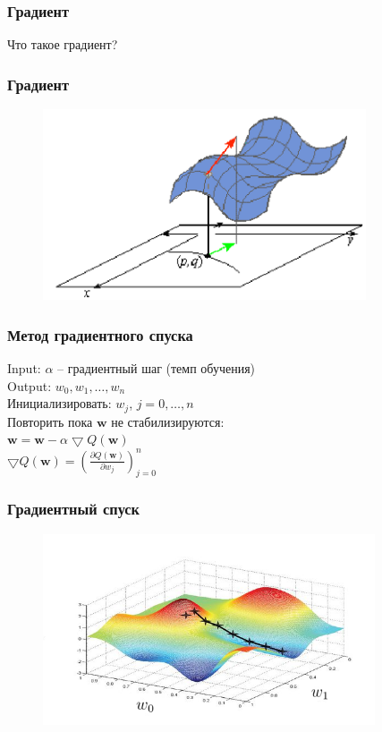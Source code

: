 \documentclass[12pt]{beamer}
\begin{document}
\begin{frame}\frametitle{Градиент}
Что такое градиент?
\end{frame}

\begin{frame}\frametitle{Градиент}
\begin{figure}[htbp]
  \includegraphics[height=160pt, keepaspectratio = true]{images/gradient}
\end{figure}
\end{frame}

\begin{frame}\frametitle{Метод градиентного спуска}
Input: $\alpha$ -- градиентный шаг (темп обучения)\\
Output: $w_0, w_1, \dots, w_n$\\
\vspace{3mm}
Инициализировать: $w_j$, $j=0,\dots, n$\\
Повторить пока $\mathbf{w}$ не стабилизируются:\\
\hspace{10mm} $\mathbf{w} =  \mathbf{w} - \alpha \bigtriangledown Q(\mathbf{w})$\\

\vspace{10mm}
$\bigtriangledown Q(\mathbf{w}) = (\frac{\partial Q(\mathbf{w})}{\partial w_j})_{j=0}^n$\\
\end{frame}

\begin{frame}\frametitle{Градиентный спуск}
\begin{figure}[htbp]
  \includegraphics[height=160pt, keepaspectratio = true]{images/gradient_descent}
\end{figure}
\end{frame}
\end{document}
